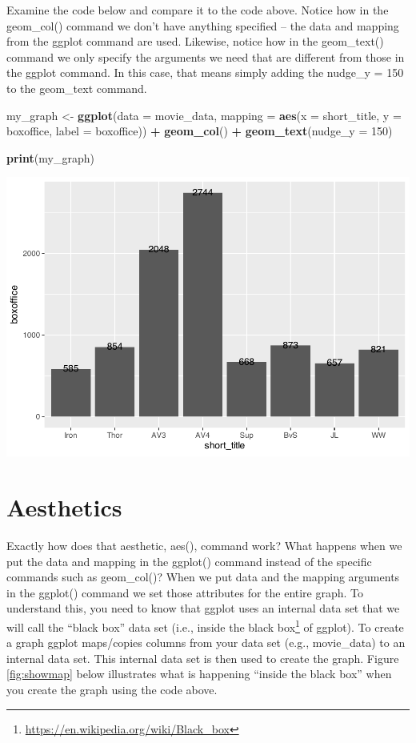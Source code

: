 \documentclass[
]{krantz}
\makeatletter
\newenvironment{Shaded}{\begin{snugshade}}{\end{snugshade}}
\newcommand{\DataTypeTok}[1]{\textcolor[rgb]{0.27,0.27,0.27}{#1}}
\newcommand{\DecValTok}[1]{\textcolor[rgb]{0.06,0.06,0.06}{#1}}
\newcommand{\KeywordTok}[1]{\textcolor[rgb]{0.27,0.27,0.27}{\textbf{#1}}}
\newcommand{\NormalTok}[1]{#1}
\newcommand{\OperatorTok}[1]{\textcolor[rgb]{0.43,0.43,0.43}{\textbf{#1}}}
\newcommand{\StringTok}[1]{\textcolor[rgb]{0.5,0.5,0.5}{#1}}
\renewcommand{\href}[2]{#2\footnote{\url{#1}}}
\newenvironment{kframe}{%
\medskip{}
\setlength{\fboxsep}{.8em}
 \def\at@end@of@kframe{}%
 \ifinner\ifhmode%
  \def\at@end@of@kframe{\end{minipage}}%
  \begin{minipage}{\columnwidth}%
 \fi\fi%
 \def\FrameCommand##1{\hskip\@totalleftmargin \hskip-\fboxsep
 \colorbox{shadecolor}{##1}\hskip-\fboxsep
     \hskip-\linewidth \hskip-\@totalleftmargin \hskip\columnwidth}%
 \MakeFramed {\advance\hsize-\width
   \@totalleftmargin\z@ \linewidth\hsize
   \@setminipage}}%
 {\par\unskip\endMakeFramed%
 \at@end@of@kframe}
\renewenvironment{Shaded}{\begin{kframe}}{\end{kframe}}
\makeatother
\begin{document}
Examine the code below and compare it to the code above. Notice how in the geom\_col() command we don't have anything specified -- the data and mapping from the ggplot command are used. Likewise, notice how in the geom\_text() command we only specify the arguments we need that are different from those in the ggplot command. In this case, that means simply adding the nudge\_y = 150 to the geom\_text command.

\begin{Shaded}
\begin{Highlighting}[]
\NormalTok{my_graph <-}\StringTok{ }\KeywordTok{ggplot}\NormalTok{(}\DataTypeTok{data =}\NormalTok{ movie_data,}
           \DataTypeTok{mapping =} \KeywordTok{aes}\NormalTok{(}\DataTypeTok{x =}\NormalTok{ short_title,}
                         \DataTypeTok{y =}\NormalTok{ boxoffice,}
                         \DataTypeTok{label =}\NormalTok{ boxoffice)) }\OperatorTok{+}
\StringTok{  }\KeywordTok{geom_col}\NormalTok{() }\OperatorTok{+}
\StringTok{  }\KeywordTok{geom_text}\NormalTok{(}\DataTypeTok{nudge_y =} \DecValTok{150}\NormalTok{) }

\KeywordTok{print}\NormalTok{(my_graph)}
\end{Highlighting}
\end{Shaded}

\includegraphics[width=0.65\linewidth]{bookdown_files/figure-latex/unnamed-chunk-111-1}

\hypertarget{aesthetics}{%
\section{Aesthetics}\label{aesthetics}}

Exactly how does that aesthetic, aes(), command work? What happens when we put the data and mapping in the ggplot() command instead of the specific commands such as geom\_col()? When we put data and the mapping arguments in the ggplot() command we set those attributes for the entire graph. To understand this, you need to know that ggplot uses an internal data set that we will call the ``black box'' data set (i.e., inside the \href{https://en.wikipedia.org/wiki/Black_box}{black box} of ggplot). To create a graph ggplot maps/copies columns from your data set (e.g., movie\_data) to an internal data set. This internal data set is then used to create the graph. Figure \ref{fig:showmap} below illustrates what is happening ``inside the black box'' when you create the graph using the code above.
\end{document}

